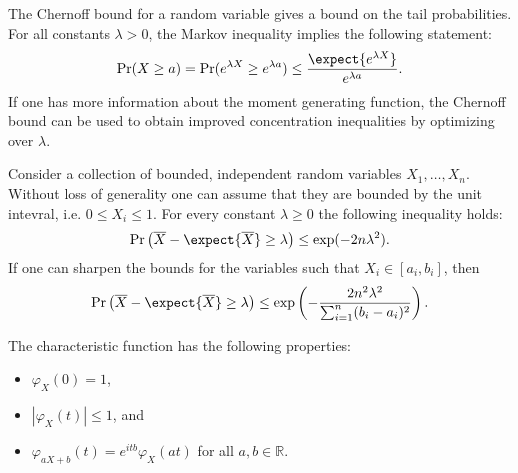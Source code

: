     \begin{method}
        The Chernoff bound for a random variable gives a bound on the tail probabilities. For all constants $\lambda>0$, the Markov inequality implies the following statement:
        \begin{gather}
            \mathrm{Pr}(X\geq a)=\mathrm{Pr}(e^{\lambda X}\geq e^{\lambda a})\leq\frac{\expect{e^{\lambda X}}}{e^{\lambda a}}.
        \end{gather}
        If one has more information about the moment generating function, the Chernoff bound can be used to obtain improved concentration inequalities by optimizing over $\lambda$.
    \end{method}
    \begin{property}\label{prob:hoeffding_inequality}
        Consider a collection of bounded, independent random variables $X_1,\ldots,X_n$. Without loss of generality one can assume that they are bounded by the unit intevral, i.e. $0\leq X_i\leq 1$. For every constant $\lambda\geq0$ the following inequality holds:
        \begin{gather}
            \mathrm{Pr}\left(\overline{X}-\expect{\overline{X}}\geq\lambda\right)\leq\exp(-2n\lambda^2).
        \end{gather}
        If one can sharpen the bounds for the variables such that $X_i\in[a_i,b_i]$, then
        \begin{gather}
            \mathrm{Pr}\left(\overline{X}-\expect{\overline{X}}\geq\lambda\right)\leq\exp\left(-\frac{2n^2\lambda^2}{\sum_{i=1}^n(b_i-a_i)^2}\right).
        \end{gather}
    \end{property}

    \begin{property}\label{prob:characteristic_function_properties}
        The characteristic function has the following properties:
        \begin{itemize}
            \item $\varphi_X(0) = 1$,
            \item $|\varphi_X(t)| \leq 1$, and
            \item $\varphi_{aX+b}(t) = e^{itb}\varphi_X(at)$ for all $a,b\in\mathbb{R}$.
        \end{itemize}
    \end{property}

